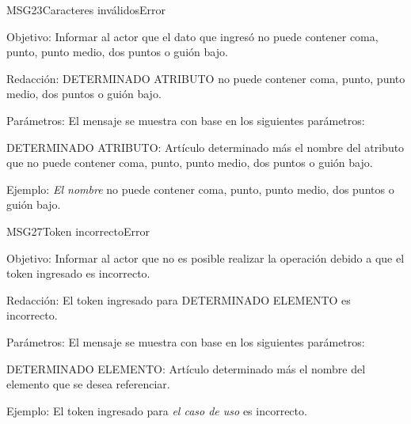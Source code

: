 \begin{mensaje}{MSG23}{Caracteres inválidos}{Error}
    \item[Objetivo:] Informar al actor que el dato que ingresó no puede contener coma, punto, punto medio, dos puntos o guión bajo.
    \item[Redacción:] DETERMINADO ATRIBUTO no puede contener coma, punto, punto medio, dos puntos o guión bajo.
    \item[Parámetros:] El mensaje se muestra con base en los siguientes parámetros:
    \begin{Citemize}
	\item DETERMINADO ATRIBUTO: Artículo determinado más el nombre del atributo que no puede contener coma, punto, punto medio, dos puntos o guión bajo.
    \end{Citemize}
    \item[Ejemplo:] { \em El nombre} no puede contener coma, punto, punto medio, dos puntos o guión bajo.
\end{mensaje}
\begin{mensaje}{MSG27}{Token incorrecto}{Error}
    \item[Objetivo:] Informar al actor que no es posible realizar la operación debido a que el token ingresado es incorrecto.
    \item[Redacción:] El token ingresado para DETERMINADO ELEMENTO es incorrecto.
    \item[Parámetros:] El mensaje se muestra con base en los siguientes parámetros:
    \begin{Citemize}
	\item DETERMINADO ELEMENTO: Artículo determinado más el nombre del elemento que se desea referenciar.
    \end{Citemize}
    \item[Ejemplo:] El token ingresado para { \em el caso de uso} es incorrecto.
\end{mensaje}

